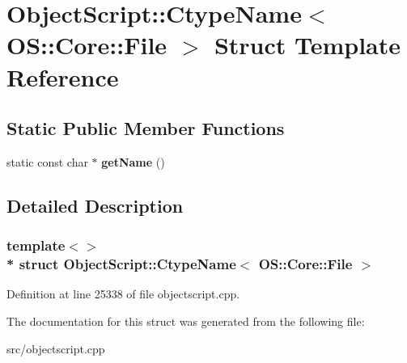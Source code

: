 \hypertarget{struct_object_script_1_1_ctype_name_3_01_o_s_1_1_core_1_1_file_01_4}{}\section{Object\+Script\+:\+:Ctype\+Name$<$ OS\+:\+:Core\+:\+:File $>$ Struct Template Reference}
\label{struct_object_script_1_1_ctype_name_3_01_o_s_1_1_core_1_1_file_01_4}
\subsection*{Static Public Member Functions}
\begin{DoxyCompactItemize}
\item 
static const char $\ast$ {\bfseries get\+Name} ()\hypertarget{struct_object_script_1_1_ctype_name_3_01_o_s_1_1_core_1_1_file_01_4_ac3d5ba44a4ff585922443199586bb192}{}\label{struct_object_script_1_1_ctype_name_3_01_o_s_1_1_core_1_1_file_01_4_ac3d5ba44a4ff585922443199586bb192}

\end{DoxyCompactItemize}


\subsection{Detailed Description}
\subsubsection*{template$<$$>$\\*
struct Object\+Script\+::\+Ctype\+Name$<$ O\+S\+::\+Core\+::\+File $>$}



Definition at line 25338 of file objectscript.\+cpp.



The documentation for this struct was generated from the following file\+:\begin{DoxyCompactItemize}
\item 
src/objectscript.\+cpp\end{DoxyCompactItemize}

